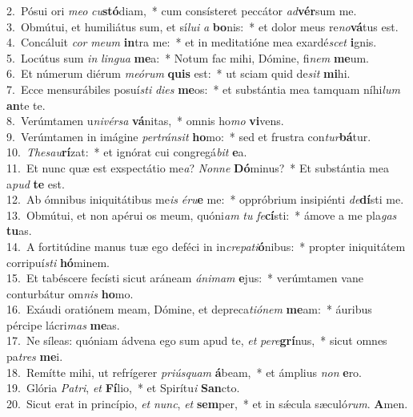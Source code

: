 {2.~}Pósui ori \textit{me}\textit{o} \textit{cu}\textbf{stó}diam,~* cum consísteret peccátor \textit{ad}\textbf{vér}sum me.\\
{3.~}Obmútui, et humiliátus sum, et sí\textit{lu}\textit{i} \textit{a} \textbf{bo}nis:~* et dolor meus re\textit{no}\textbf{vá}tus est.\\
{4.~}Concáluit \textit{cor} \textit{me}\textit{um} \textbf{in}tra me:~* et in meditatióne mea exardé\textit{scet} \textbf{i}gnis.\\
{5.~}Locútus sum \textit{in} \textit{lin}\textit{gua} \textbf{me}a:~* Notum fac mihi, Dómine, fi\textit{nem} \textbf{me}um.\\
{6.~}Et númerum diérum \textit{me}\textit{ó}\textit{rum} \textbf{quis} est:~* ut sciam quid de\textit{sit} \textbf{mi}hi.\\
{7.~}Ecce mensurábiles posuí\textit{sti} \textit{di}\textit{es} \textbf{me}os:~* et substántia mea tamquam níhi\textit{lum} \textbf{an}te te.\\
{8.~}Verúmtamen u\textit{ni}\textit{vér}\textit{sa} \textbf{vá}nitas,~* omnis ho\textit{mo} \textbf{vi}vens.\\
{9.~}Verúmtamen in imágine \textit{per}\textit{trán}\textit{sit} \textbf{ho}mo:~* sed et frustra con\textit{tur}\textbf{bá}tur.\\
{10.~}\textit{The}\textit{sau}\textbf{rí}zat:~* et ignórat cui congregá\textit{bit} \textbf{e}a.\\
{11.~}Et nunc quæ est exspectátio me\textit{a}? \textit{Non}\textit{ne} \textbf{Dó}minus?~* Et substántia mea a\textit{pud} \textbf{te} est.\\
{12.~}Ab ómnibus iniquitátibus me\textit{is} \textit{é}\textit{ru}\textbf{e} me:~* oppróbrium insipiénti \textit{de}\textbf{dí}sti me.\\
{13.~}Obmútui, et non apérui os meum, quóni\textit{am} \textit{tu} \textit{fe}\textbf{cí}sti:~* ámove a me pla\textit{gas} \textbf{tu}as.\\
{14.~}A fortitúdine manus tuæ ego deféci in in\textit{cre}\textit{pa}\textit{ti}\textbf{ó}nibus:~* propter iniquitátem corripuí\textit{sti} \textbf{hó}minem.\\
{15.~}Et tabéscere fecísti sicut aráneam \textit{á}\textit{ni}\textit{mam} \textbf{e}jus:~* verúmtamen vane conturbátur om\textit{nis} \textbf{ho}mo.\\
{16.~}Exáudi oratiónem meam, Dómine, et depreca\textit{ti}\textit{ó}\textit{nem} \textbf{me}am:~* áuribus pércipe lácri\textit{mas} \textbf{me}as.\\
{17.~}Ne síleas: quóniam ádvena ego sum apud te, \textit{et} \textit{pe}\textit{re}\textbf{grí}nus,~* sicut omnes pa\textit{tres} \textbf{me}i.\\
{18.~}Remítte mihi, ut refrígerer \textit{pri}\textit{ús}\textit{quam} \textbf{á}beam,~* et ámplius \textit{non} \textbf{e}ro.\\
{19.~}Glória \textit{Pa}\textit{tri}, \textit{et} \textbf{Fí}lio,~* et Spirítu\textit{i} \textbf{San}cto.\\
{20.~}Sicut erat in princípio, \textit{et} \textit{nunc}, \textit{et} \textbf{sem}per,~* et in sǽcula sæculó\textit{rum}. \textbf{A}men.\\
